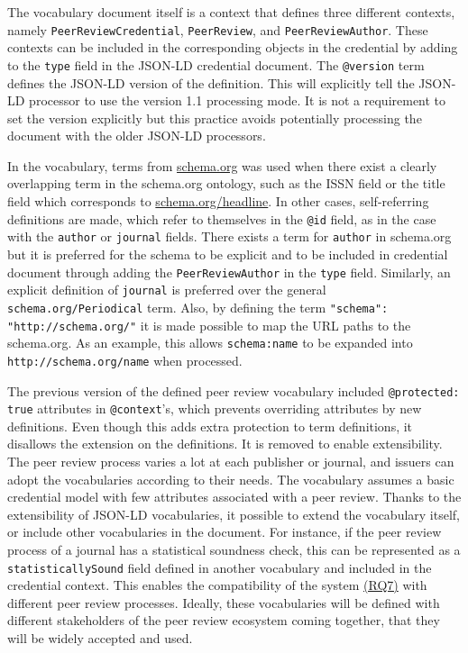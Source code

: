 

The vocabulary document itself is a context that defines three different contexts, namely \lstinline{PeerReviewCredential}, \lstinline{PeerReview}, and \lstinline{PeerReviewAuthor}. These contexts can be included in the corresponding objects in the credential by adding to the \lstinline{type} field in the \acrshort{JSON-LD} credential document. The \lstinline{@version} term defines the \acrshort{JSON-LD} version of the definition. This will explicitly tell the \acrshort{JSON-LD} processor to use the version 1.1 processing mode. It is not a requirement to set the version explicitly but this practice avoids potentially processing the document with the older \acrshort{JSON-LD} processors. 


In the vocabulary, terms from \url{schema.org} was used when there exist a clearly overlapping term in the schema.org ontology, such as the \acrshort{ISSN} field or the title field which corresponds to \url{schema.org/headline}. In other cases, self-referring definitions are made, which refer to themselves in the \lstinline{@id} field, as in the case with the \lstinline{author} or \lstinline{journal} fields. There exists a term for \lstinline{author} in schema.org but it is preferred for the schema to be explicit and to be included in credential document through adding the \lstinline{PeerReviewAuthor} in the \lstinline{type} field. Similarly, an explicit definition of \lstinline{journal} is preferred over the general \lstinline{schema.org/Periodical} term. Also, by defining the term \lstinline{"schema": "http://schema.org/"} it is made possible to map the \acrshort{URL} paths to the schema.org. As an example, this allows \lstinline{schema:name} to be expanded into \lstinline{http://schema.org/name} when processed. 

The previous version of the defined peer review vocabulary included \lstinline{@protected: true} attributes in \lstinline{@context}'s, which prevents overriding attributes by new definitions. Even though this adds extra protection to term definitions, it disallows the extension on the definitions. It is removed to enable extensibility. The peer review process varies a lot at each publisher or journal, and issuers can adopt the vocabularies according to their needs. The vocabulary assumes a basic credential model with few attributes associated with a peer review. Thanks to the extensibility of \acrshort{JSON-LD} vocabularies, it possible to extend the vocabulary itself, or include other vocabularies in the document. For instance, if the peer review process of a journal has a statistical soundness check, this can be represented as a \lstinline{statisticallySound} field defined in another vocabulary and included in the credential context. This enables the compatibility of the system \hyperref[rq:compatible]{(RQ7)} with different peer review processes.  Ideally, these vocabularies will be defined with different stakeholders of the peer review ecosystem coming together, that they will be widely accepted and used.


